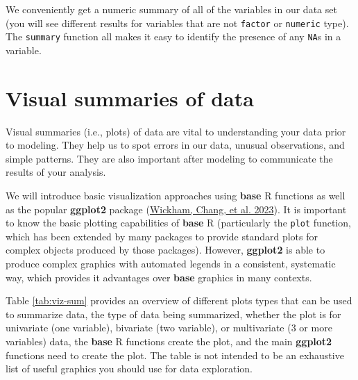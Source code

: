 \documentclass[
]{book}
\theoremstyle{definition}
\theoremstyle{definition}
\theoremstyle{definition}
\theoremstyle{definition}
\theoremstyle{remark}
\begin{document}
We conveniently get a numeric summary of all of the variables in our data set (you will see different results for variables that are not \texttt{factor} or \texttt{numeric} type). The \texttt{summary} function all makes it easy to identify the presence of any \texttt{NA}s in a variable.

\hypertarget{visual-summaries-of-data}{%
\section{Visual summaries of data}\label{visual-summaries-of-data}}

Visual summaries (i.e., plots) of data are vital to understanding your data prior to modeling. They help us to spot errors in our data, unusual observations, and simple patterns. They are also important after modeling to communicate the results of your analysis.

We will introduce basic visualization approaches using \textbf{base} R functions as well as the popular \textbf{ggplot2} package (\protect\hyperlink{ref-R-ggplot2}{Wickham, Chang, et al. 2023}). It is important to know the basic plotting capabilities of \textbf{base} R (particularly the \texttt{plot} function, which has been extended by many packages to provide standard plots for complex objects produced by those packages). However, \textbf{ggplot2} is able to produce complex graphics with automated legends in a consistent, systematic way, which provides it advantages over \textbf{base} graphics in many contexts.

Table \ref{tab:viz-sum} provides an overview of different plots types that can be used to summarize data, the type of data being summarized, whether the plot is for univariate (one variable), bivariate (two variable), or multivariate (3 or more variables) data, the \textbf{base} R functions create the plot, and the main \textbf{ggplot2} functions need to create the plot. The table is not intended to be an exhaustive list of useful graphics you should use for data exploration.
\end{document}
